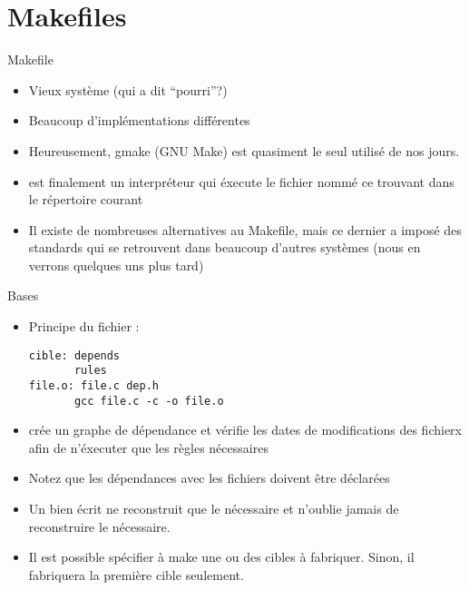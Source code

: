 \section{Makefiles}

\begin{frame}[fragile=singleslide]{Makefile}
  \begin{itemize} 
  \item Vieux système (qui a dit ``pourri''?)
  \item Beaucoup d'implémentations différentes
  \item Heureusement,  gmake (GNU Make) est quasiment  le seul utilisé
    de nos jours.
  \item  {}  est finalement  un  interpréteur  qui éxecute  le
    fichier  nommé    ce  trouvant dans  le  répertoire
    courant
  \item  Il existe  de nombreuses  alternatives au  Makefile,  mais ce
    dernier  a imposé des  standards qui  se retrouvent  dans beaucoup
    d'autres systèmes (nous en verrons quelques uns plus tard)
  \end{itemize} 
\end{frame} 

\begin{frame}[fragile=singleslide]{Bases}
  \begin{itemize} 
  \item Principe du fichier :
    \begin{lstlisting} 
cible: depends
       rules
file.o: file.c dep.h
       gcc file.c -c -o file.o
    \end{lstlisting} 
  \item {} crée  un graphe de dépendance et  vérifie les dates
    de modifications  des fichierx afin  de n'éxecuter que  les règles
    nécessaires
  \item Notez que les  dépendances avec les fichiers  doivent
    être déclarées
  \item Un  bien écrit ne reconstruit que le nécessaire
    et n'oublie jamais de reconstruire le nécessaire.
  \item  Il  est  possible  spécifier  à  make une  ou  des  cibles  à
    fabriquer. Sinon, il fabriquera la première cible seulement.
  \end{itemize}
\end{frame}

